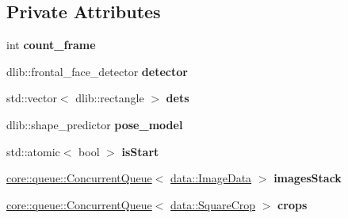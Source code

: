\subsection*{Private Attributes}
\begin{DoxyCompactItemize}
\item 
\mbox{\label{classfilter_1_1algos_1_1_face_detection_abfadcb02d35c53d8a3ab28954cc314af}} 
int {\bfseries count\+\_\+frame}
\item 
\mbox{\label{classfilter_1_1algos_1_1_face_detection_a8b6ccde0164cf10af292783b681879f6}} 
dlib\+::frontal\+\_\+face\+\_\+detector {\bfseries detector}
\item 
\mbox{\label{classfilter_1_1algos_1_1_face_detection_af81d5732a898f7e0c520793fa24fe1f0}} 
std\+::vector$<$ dlib\+::rectangle $>$ {\bfseries dets}
\item 
\mbox{\label{classfilter_1_1algos_1_1_face_detection_ad3c599a6092589aeba2e419593e177d4}} 
dlib\+::shape\+\_\+predictor {\bfseries pose\+\_\+model}
\item 
\mbox{\label{classfilter_1_1algos_1_1_face_detection_a271adfc633d2083f454174d0056a3516}} 
std\+::atomic$<$ bool $>$ {\bfseries is\+Start}
\item 
\mbox{\label{classfilter_1_1algos_1_1_face_detection_a5b1238db7b8e2edb5417e8d9601467f9}} 
\hyperlink{classcore_1_1queue_1_1_concurrent_queue}{core\+::queue\+::\+Concurrent\+Queue}$<$ \hyperlink{classfilter_1_1data_1_1_image_data}{data\+::\+Image\+Data} $>$ {\bfseries images\+Stack}
\item 
\mbox{\label{classfilter_1_1algos_1_1_face_detection_addc2283a606d2eea3a0a62d5d403acef}} 
\hyperlink{classcore_1_1queue_1_1_concurrent_queue}{core\+::queue\+::\+Concurrent\+Queue}$<$ \hyperlink{classfilter_1_1data_1_1_square_crop}{data\+::\+Square\+Crop} $>$ {\bfseries crops}
\item 
\mbox{\label{classfilter_1_1algos_1_1_face_detection_a938767be5946dead5970c667b5164043}} 

\end{DoxyCompactItemize}

